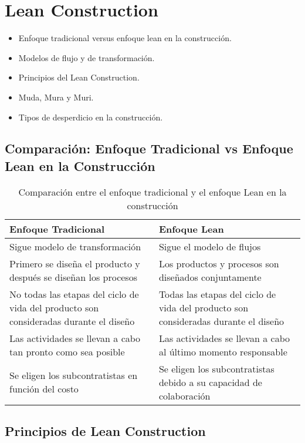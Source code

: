\section{Lean Construction}

\begin{itemize}
    \item Enfoque tradicional versus enfoque lean en la construcción.
    \item Modelos de flujo y de transformación.
    \item Principios del Lean Construction.
    \item Muda, Mura y Muri.
    \item Tipos de desperdicio en la construcción.
\end{itemize}

\subsection*{Comparación: Enfoque Tradicional vs Enfoque Lean en la Construcción}

\begin{table}[h]
    \centering
    \small
    \begin{tabular}{|p{6.5cm}|p{6.5cm}|}
        \hline
        \textbf{Enfoque Tradicional} & \textbf{Enfoque Lean} \\
        \hline
        Sigue modelo de transformación & Sigue el modelo de flujos \\
        \hline
        Primero se diseña el producto y después se diseñan los procesos & Los productos y procesos son diseñados conjuntamente \\
        \hline
        No todas las etapas del ciclo de vida del producto son consideradas durante el diseño & Todas las etapas del ciclo de vida del producto son consideradas durante el diseño \\
        \hline
        Las actividades se llevan a cabo tan pronto como sea posible & Las actividades se llevan a cabo al último momento responsable \\
        \hline
        Se eligen los subcontratistas en función del costo & Se eligen los subcontratistas debido a su capacidad de colaboración \\
        \hline
    \end{tabular}
    \caption{Comparación entre el enfoque tradicional y el enfoque Lean en la construcción}
\end{table}

\subsection*{Principios de Lean Construction}

